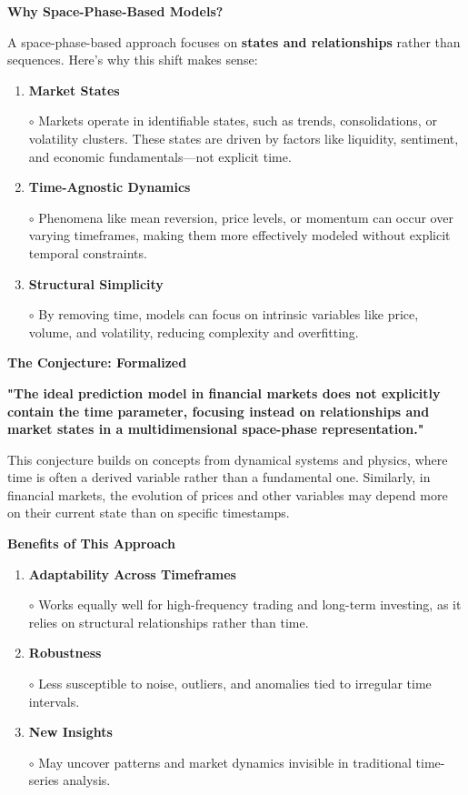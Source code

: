 \documentclass{article}
\newcommand{\bn}{\bigskip\noindent}
\begin{document}
\bn
{\large\bf  Why Space-Phase-Based Models?}

\bn
A space-phase-based approach focuses on {\bf states and relationships} rather than sequences. Here's why this shift makes sense:

\begin{enumerate}[1.]
\item  {\bf Market States}

    $\circ$   Markets operate in identifiable states, such as trends, consolidations, or volatility clusters. These states are driven by factors like liquidity, sentiment, and economic fundamentals---not explicit time.


\item  {\bf Time-Agnostic Dynamics}

    $\circ$   Phenomena like mean reversion, price levels, or momentum can occur over varying timeframes, making them more effectively modeled without explicit temporal constraints.

\item  {\bf Structural Simplicity}

    $\circ$   By removing time, models can focus on intrinsic variables like price, volume, and volatility, reducing complexity and overfitting.
\end{enumerate}


\bn
{\large\bf  The Conjecture: Formalized}

\bn
{\bf "The ideal prediction model in financial markets does not explicitly contain the time parameter, focusing instead on relationships and market states in a multidimensional space-phase representation."}

\bn
This conjecture builds on concepts from dynamical systems and physics, where time is often a derived variable rather than a fundamental one. Similarly, in financial markets, the evolution of prices and other variables may depend more on their current state than on specific timestamps.



\bn
{\large\bf Benefits of This Approach}

\begin{enumerate}[1.]
\item  {\bf Adaptability Across Timeframes}

    $\circ$   Works equally well for high-frequency trading and long-term investing, as it relies on structural relationships rather than time.

\item  {\bf Robustness}

    $\circ$   Less susceptible to noise, outliers, and anomalies tied to irregular time intervals.

\item  {\bf New Insights}

    $\circ$   May uncover patterns and market dynamics invisible in traditional time-series analysis.
\end{enumerate}
\end{document}
